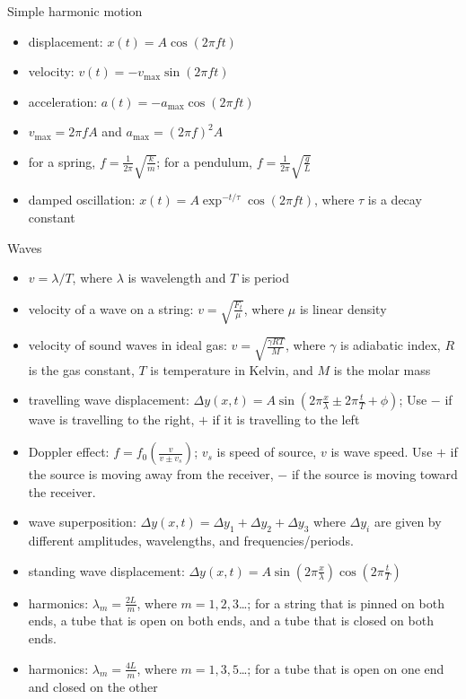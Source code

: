 \documentclass[11pt,letterpaper]{article}
\begin{document}
Simple harmonic motion
\begin{itemize}
\item displacement: $x(t)=A\cos(2\pi{f}t)$
\item velocity: $v(t)=-v_{\mathrm{max}}\sin(2\pi{f}t)$
\item acceleration: $a(t)=-a_{\mathrm{max}}\cos(2\pi{f}t)$
\item $v_{\mathrm{max}}=2\pi{f}A$ and $a_{\mathrm{max}}=(2\pi{f})^2A$
\item for a spring, $f=\frac{1}{2\pi}\sqrt{\frac{k}{m}}$; for a pendulum, $f=\frac{1}{2\pi}\sqrt{\frac{g}{L}}$
\item damped oscillation: $x(t)=A\exp^{-t/\tau}\cos(2\pi{f}t)$, where $\tau$ is a decay constant
\end{itemize}
Waves
\begin{itemize}
\item $v=\lambda/T$, where $\lambda$ is wavelength and $T$ is period
\item velocity of a wave on a string: $v=\sqrt{\frac{F_t}{\mu}}$, where $\mu$ is linear density
\item velocity of sound waves in ideal gas: $v=\sqrt{\frac{\gamma{RT}}{M}}$, where $\gamma$ is adiabatic index, $R$ is the gas constant, $T$ is temperature in Kelvin, and $M$ is the molar mass
\item travelling wave displacement: $\Delta{y}(x,t)=A\sin\left(2\pi\frac{x}{\lambda}\pm 2\pi\frac{t}{T}+\phi\right)$; Use $-$ if wave is travelling to the right, $+$ if it is travelling to the left
\item Doppler effect: $f=f_0\displaystyle\left(\frac{v}{v\pm{v_s}}\right)$; $v_s$ is speed of source, $v$ is wave speed. Use $+$ if the source is moving away from the receiver, $-$ if the source is moving toward the receiver.
\item wave superposition: $\Delta{y}(x,t)=\Delta{y}_1+\Delta{y}_2+\Delta{y}_3$ where $\Delta{y}_i$ are given by different amplitudes, wavelengths, and frequencies/periods.
\item standing wave displacement: $\Delta{y}(x,t)=A\sin\left(2\pi\frac{x}{\lambda}\right)\cos\left(2\pi\frac{t}{T}\right)$
\item harmonics: $\lambda_m=\frac{2L}{m}$, where $m=1,2,3$\ldots; for a string that is pinned on both ends, a tube that is open on both ends, and a tube that is closed on both ends.
\item harmonics: $\lambda_m=\frac{4L}{m}$, where $m=1,3,5$\ldots; for a tube that is open on one end and closed on the other
\end{itemize}
\end{document}

